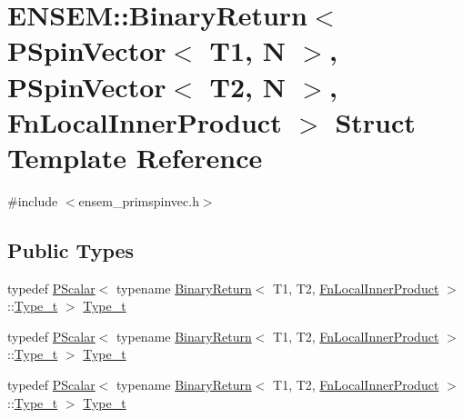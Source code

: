 \hypertarget{structENSEM_1_1BinaryReturn_3_01PSpinVector_3_01T1_00_01N_01_4_00_01PSpinVector_3_01T2_00_01N_0165efe80400678b53a582cdf54c5c66b4}{}\section{E\+N\+S\+EM\+:\+:Binary\+Return$<$ P\+Spin\+Vector$<$ T1, N $>$, P\+Spin\+Vector$<$ T2, N $>$, Fn\+Local\+Inner\+Product $>$ Struct Template Reference}
\label{structENSEM_1_1BinaryReturn_3_01PSpinVector_3_01T1_00_01N_01_4_00_01PSpinVector_3_01T2_00_01N_0165efe80400678b53a582cdf54c5c66b4}


{\ttfamily \#include $<$ensem\+\_\+primspinvec.\+h$>$}

\subsection*{Public Types}
\begin{DoxyCompactItemize}
\item 
typedef \mbox{\hyperlink{classENSEM_1_1PScalar}{P\+Scalar}}$<$ typename \mbox{\hyperlink{structENSEM_1_1BinaryReturn}{Binary\+Return}}$<$ T1, T2, \mbox{\hyperlink{structENSEM_1_1FnLocalInnerProduct}{Fn\+Local\+Inner\+Product}} $>$\+::\mbox{\hyperlink{structENSEM_1_1BinaryReturn_3_01PSpinVector_3_01T1_00_01N_01_4_00_01PSpinVector_3_01T2_00_01N_0165efe80400678b53a582cdf54c5c66b4_ac2b00a1c9759321859143d7e640bc27f}{Type\+\_\+t}} $>$ \mbox{\hyperlink{structENSEM_1_1BinaryReturn_3_01PSpinVector_3_01T1_00_01N_01_4_00_01PSpinVector_3_01T2_00_01N_0165efe80400678b53a582cdf54c5c66b4_ac2b00a1c9759321859143d7e640bc27f}{Type\+\_\+t}}
\item 
typedef \mbox{\hyperlink{classENSEM_1_1PScalar}{P\+Scalar}}$<$ typename \mbox{\hyperlink{structENSEM_1_1BinaryReturn}{Binary\+Return}}$<$ T1, T2, \mbox{\hyperlink{structENSEM_1_1FnLocalInnerProduct}{Fn\+Local\+Inner\+Product}} $>$\+::\mbox{\hyperlink{structENSEM_1_1BinaryReturn_3_01PSpinVector_3_01T1_00_01N_01_4_00_01PSpinVector_3_01T2_00_01N_0165efe80400678b53a582cdf54c5c66b4_ac2b00a1c9759321859143d7e640bc27f}{Type\+\_\+t}} $>$ \mbox{\hyperlink{structENSEM_1_1BinaryReturn_3_01PSpinVector_3_01T1_00_01N_01_4_00_01PSpinVector_3_01T2_00_01N_0165efe80400678b53a582cdf54c5c66b4_ac2b00a1c9759321859143d7e640bc27f}{Type\+\_\+t}}
\item 
typedef \mbox{\hyperlink{classENSEM_1_1PScalar}{P\+Scalar}}$<$ typename \mbox{\hyperlink{structENSEM_1_1BinaryReturn}{Binary\+Return}}$<$ T1, T2, \mbox{\hyperlink{structENSEM_1_1FnLocalInnerProduct}{Fn\+Local\+Inner\+Product}} $>$\+::\mbox{\hyperlink{structENSEM_1_1BinaryReturn_3_01PSpinVector_3_01T1_00_01N_01_4_00_01PSpinVector_3_01T2_00_01N_0165efe80400678b53a582cdf54c5c66b4_ac2b00a1c9759321859143d7e640bc27f}{Type\+\_\+t}} $>$ \mbox{\hyperlink{structENSEM_1_1BinaryReturn_3_01PSpinVector_3_01T1_00_01N_01_4_00_01PSpinVector_3_01T2_00_01N_0165efe80400678b53a582cdf54c5c66b4_ac2b00a1c9759321859143d7e640bc27f}{Type\+\_\+t}}
\end{DoxyCompactItemize}


